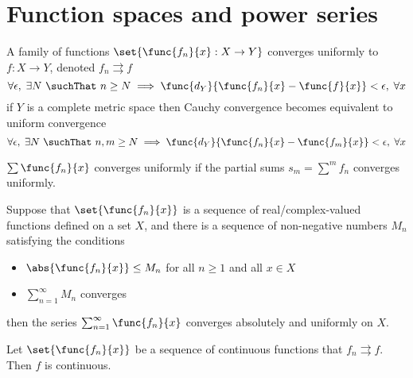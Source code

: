 \section{Function spaces and power series}
A family of functions \(\set{\func{f_n}{x} : X \to Y}\) converges uniformly to \(f : X \to Y\), denoted \(f_n \rightrightarrows f\)
\begin{equation*}
      \forall \epsilon, \; \exists N \ \suchThat \ n \geq N \implies \func{d_Y}{\func{f_n}{x} - \func{f}{x}} < \epsilon, \; \forall x
\end{equation*}
if \(Y\) is a complete metric space then Cauchy convergence becomes equivalent to uniform convergence 
\begin{equation*}
      \forall \epsilon, \; \exists N \ \suchThat \ n,m \geq N \implies \func{d_Y}{\func{f_n}{x} - \func{f_m}{x}} < \epsilon, \; \forall x
\end{equation*}

\(\sum \func{f_n}{x}\) converges uniformly if the partial sums \(s_m = \sum^m f_n\) converges uniformly.

\begin{theorem}
      Suppose that \(\set{\func{f_n}{x}}\) is a sequence of real/complex-valued functions defined on a set \(X\), and there is a sequence of non-negative numbers \(M_n\) satisfying the conditions 
      \begin{itemize}
            \item \(\abs{\func{f_n}{x}} \leq M_n\) for all \(n \geq 1\) and all \(x \in X\)
            \item \(\sum_{n = 1}^{\infty} M_n\) converges 
      \end{itemize}
      then the series \(\sum_{n=1}^{\infty} \func{f_n}{x}\) converges absolutely and uniformly on \(X\).
\end{theorem}


\begin{theorem}
      Let \(\set{\func{f_n}{x}}\) be a sequence of continuous functions that \(f_n \rightrightarrows f\). Then \(f\) is continuous.
\end{theorem}